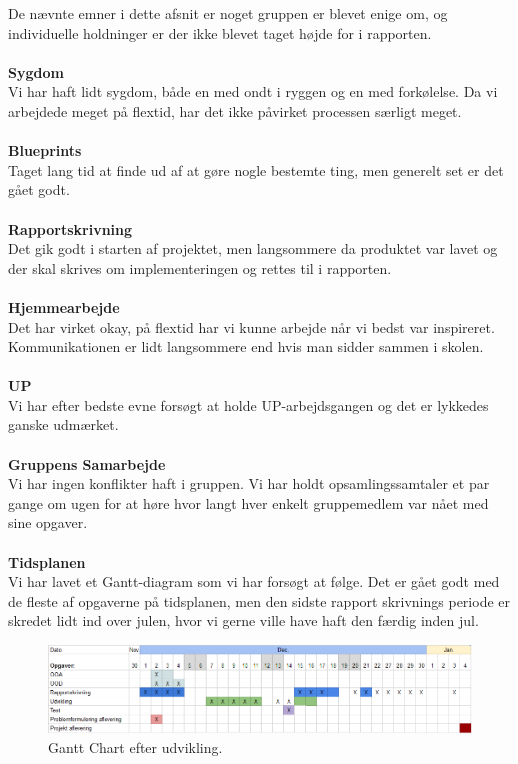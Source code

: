 De nævnte emner i dette afsnit er noget gruppen er blevet enige om, og individuelle holdninger er der ikke blevet taget højde for i rapporten.\\
\\
\textbf{Sygdom}\\
Vi har haft lidt sygdom, både en med ondt i ryggen og en med forkølelse. Da vi arbejdede meget på flextid, har det ikke påvirket processen særligt meget.\\
\\
\textbf{Blueprints}\\
Taget lang tid at finde ud af at gøre nogle bestemte ting, men generelt set er det gået godt.\\
\\
\textbf{Rapportskrivning}\\
Det gik godt i starten af projektet, men langsommere da produktet var lavet og der skal skrives om implementeringen og rettes til i rapporten.\\
\\
\textbf{Hjemmearbejde}\\
Det har virket okay, på flextid har vi kunne arbejde når vi bedst var inspireret. Kommunikationen er lidt langsommere end hvis man sidder sammen i skolen.\\
\\
\textbf{UP}\\
Vi har efter bedste evne forsøgt at holde UP-arbejdsgangen og det er lykkedes ganske udmærket.\\
\\
\textbf{Gruppens Samarbejde}\\
Vi har ingen konflikter haft i gruppen. Vi har holdt opsamlingssamtaler et par gange om ugen for at høre hvor langt hver enkelt gruppemedlem var nået med sine opgaver.\\
\\
\textbf{Tidsplanen}\\
Vi har lavet et Gantt-diagram som vi har forsøgt at følge. Det er gået godt med de fleste af opgaverne på tidsplanen, men den sidste rapport skrivnings periode er skredet lidt ind over julen, hvor vi gerne ville have haft den færdig inden jul.\\

\begin{figure}
	\begin{center}
		\caption{Gantt Chart efter udvikling.}
		\label{dia:ganttpost}
		\includegraphics[width=1\linewidth]{pictures/up/ganttpost}
	\end{center}
\end{figure}

